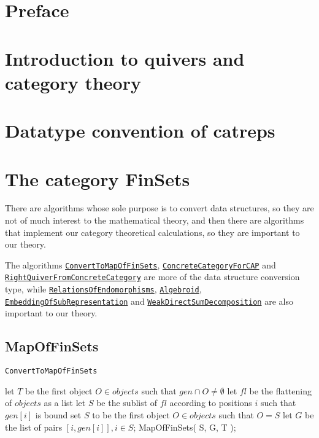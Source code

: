 \documentclass{article}
\theoremstyle{definition}
\begin{document}
\tableofcontents\label{toc}
\section{Preface}
\section{Introduction to quivers and category theory}

\section{Datatype convention of catreps}


\section{The category FinSets}

There are algorithms whose sole purpose is to convert data structures, so they are not of much interest to the mathematical theory,
and then there are algorithms that implement our category theoretical calculations, so they are important to our theory.

The algorithms \hyperref[func:ConvertToMapOfFinSets]{\texttt{ConvertToMapOfFinSets}}, 
\hyperref[func:ConcreteCategoryForCAP]{\texttt{ConcreteCategoryForCAP}} and 
\hyperref[func:RightQuiverFromConcreteCategory]{\texttt{RightQuiverFromConcreteCategory}} are
more of the data structure conversion type, while 
\hyperref[func:RelationsOfEndomorphisms]{\texttt{RelationsOfEndomorphisms}}, 
\hyperref[func:Algebroid]{\texttt{Algebroid}},
\hyperref[func:EmbeddingOfSubRepresentation]{\texttt{EmbeddingOfSubRepresentation}} and 
\hyperref[func:WeakDirectSumDecomposition]{\texttt{WeakDirectSumDecomposition}} are also important to our theory.

\subsection{MapOfFinSets}

\begin{algorithm}\capstart
   \caption{\texttt{ConvertToMapOfFinSets}}\label{algo:ConvertToMapOfFinSets}
      \BlankLine
      let $T$ be the first object $O \in objects$ such that $gen \cap O \not= \emptyset$\;
      let $fl$ be the flattening of $objects$ as a list\;
      let $S$ be the sublist of $fl$ according to positions $i$ such that $gen[i]$ is bound\;
      set $S$ to be the first object $O \in objects$ such that $O = S$\;
      \BlankLine
      let $G$ be the list of pairs $[ i, gen[i] ], i \in S$;
      \BlankLine
      \Return MapOfFinSets( S, G, T );
\end{algorithm}
\end{document}
